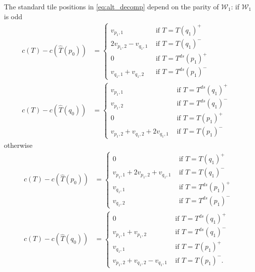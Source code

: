 \documentclass[12pt]{amsart}
\begin{document}
\begin{definition}
The standard tile positions in \eqref{eq:alt_decomp} depend on the parity of $\mathcal{W}_1$:
	if $\mathcal{W}_1$ is odd
\begin{equation} \label{eq:alt_offsets_w1_odd}
\begin{aligned}
c(T) - c(\hat{T}(p_0)) &= 
\begin{cases}
v_{p_1,1} &\mbox{ if $T = T(q_1)^+$} \\
2 v_{p_1,2} - v_{q_1,1} &\mbox{ if $T = T(q_1)^-$} \\
0 &\mbox{ if $T = T^{ds}(p_1)^+$} \\
v_{q_1,1} + v_{q_1,2} &\mbox{ if $T = T^{ds}(p_1)^-$} 
\end{cases} \\
 c(T) - c(\hat{T}(q_0)) &= 
\begin{cases}
v_{p_1,1} &\mbox{ if $T = T^{ds}(q_1)^+$} \\
v_{p_1,2}  &\mbox{ if $T = T^{ds}(q_1)^{-}$ } \\
0  &\mbox{ if $T = T(p_1)^+$ } \\
v_{p_1,2} + v_{q_1,2} + 2 v_{q_1,1} &\mbox{ if $T = T(p_1)^-$ } 
\end{cases}
\end{aligned}
\end{equation}
otherwise
\begin{equation} \label{eq:alt_offsets_w1_even}
\begin{aligned}
c(T) - c(\hat{T}(p_0)) &= 
\begin{cases}
0  &\mbox{ if $T = T(q_1)^+$} \\
v_{p_1,1} + 2 v_{p_1,2} + v_{q_1,1} &\mbox{ if $T = T(q_1)^-$} \\
v_{q_1,1} &\mbox{ if $T = T^{ds}(p_1)^+$} \\
v_{q_1,2} &\mbox{ if $T = T^{ds}(p_1)^-$} 
\end{cases} \\
c(T) - c(\hat{T}(q_0))  &= 
\begin{cases}
0 &\mbox{ if $T = T^{ds}(q_1)^+$} \\
v_{p_1,1} + v_{p_1,2}  &\mbox{ if $T = T^{ds}(q_1)^{-}$} \\
v_{q_1,1}  &\mbox{ if $T = T(p_1)^+$} \\
v_{p_1,2} + v_{q_1,2} - v_{q_1,1} &\mbox{ if $T = T(p_1)^-$}.
\end{cases}
\end{aligned}
\end{equation}




\end{definition}
\end{document}
